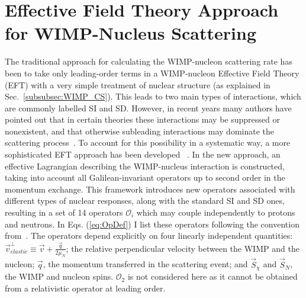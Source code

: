 \section{Effective Field Theory Approach for WIMP-Nucleus Scattering}
\label{sec:intro_EFT}

The traditional approach for calculating the WIMP-nucleon scattering rate has been to take only leading-order terms in a WIMP-nucleon Effective Field Theory (EFT) with a very simple treatment of nuclear structure (as explained in Sec.~\ref{subsubsec:WIMP_CS}). This leads to two main types of interactions, which are commonly labelled SI and SD. However, in recent years many authors have pointed out that in certain theories these interactions may be suppressed or nonexistent, and that otherwise subleading interactions may dominate the scattering process~\cite{Chang:2009yt}. To account for this possibility in a systematic way, a more sophisticated EFT approach has been developed ~\cite{Fitzpatrick:2012ib,Anand:MathTools,Fitzpatrick:MathTools}. In the new approach, an effective Lagrangian describing the WIMP-nucleus interaction is constructed, taking into account all Galilean-invariant operators up to second order in the momentum exchange. This framework introduces new operators associated with different types of nuclear responses, along with the standard SI and SD ones, resulting in a set of 14 operators $\mathcal{O}_i$ which may couple independently to protons and neutrons. In Eqs. (\ref{eq:OpDef}) I list these operators following the convention from~\cite{Anand:MathTools}. The operators depend explicitly on four linearly independent quantities: $\vec{v}_{elastic}^{\perp} \equiv \vec{v} + \frac{\vec{q}}{2\mu_N} $; the relative perpendicular velocity between the WIMP and the nucleon; $\vec{q}$, the momentum transferred in the scattering event; and $\vec{S}_\chi$ and $\vec{S}_N$, the WIMP and nucleon spins. $\mathcal{O}_2$ is not considered here as it cannot be obtained from a relativistic operator at leading order.
%

